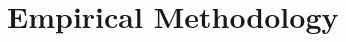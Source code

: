 \documentclass[12pt]{article}
\begin{document}
% 





\section{Empirical Methodology}\label{section:methodology}
\end{document}
